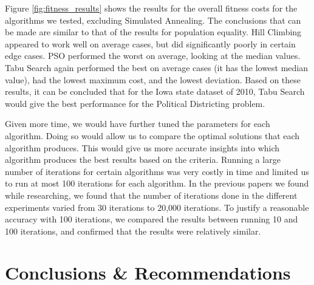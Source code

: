 \documentclass[journal]{IEEEtran}
\begin{document}
Figure \ref{fig:fitness_results} shows the results for the overall fitness costs for the algorithms we tested, excluding Simulated Annealing. The conclusions that can be made are similar to that of the results for population equality. Hill Climbing appeared to work well on average cases, but did significantly poorly in certain edge cases. PSO performed the worst on average, looking at the median values. Tabu Search again performed the best on average cases (it has the lowest median value), had the lowest maximum cost, and the lowest deviation. Based on these results, it can be concluded that for the Iowa state dataset of 2010, Tabu Search would give the best performance for the Political Districting problem. 

Given more time, we would have further tuned the parameters for each algorithm. Doing so would allow us to compare the optimal solutions that each algorithm produces. This would give us more accurate insights into which algorithm produces the best results based on the criteria. Running a large number of iterations for certain algorithms was very costly in time and limited us to run at most 100 iterations for each algorithm. In the previous papers we found while researching, we found that the number of iterations done in the different experiments varied from 30 iterations\cite{local-search-2} to 20,000 iterations\cite{geometric-ga}. To justify a reasonable accuracy with 100 iterations, we compared the results between running 10 and 100 iterations, and confirmed that the results were relatively similar. 

\section{Conclusions \& Recommendations}
\end{document}
